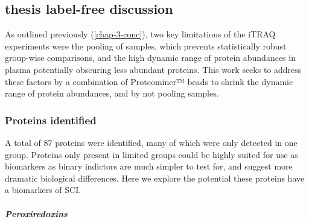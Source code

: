 \documentclass[9pt,lineno]{elife}
\begin{document}
\begin{landscape}
\begin{landscape}
\hypertarget{thesis-label-free-discussion}{%
\subsection{thesis label-free discussion}\label{thesis-label-free-discussion}}

As outlined previously (\ref{chap-3-conc}), two key limitations of the iTRAQ experiments were the pooling of samples, which prevents statistically robust group-wise comparisons, and the high dynamic range of protein abundances in plasma potentially obscuring less abundant proteins.
This work seeks to address these factors by a combination of Proteominer™ beads to shrink the dynamic range of protein abundances, and by not pooling samples.

\hypertarget{proteins-identified-1}{%
\subsubsection{Proteins identified}\label{proteins-identified-1}}

A total of 87 proteins were identified, many of which were only detected in one group.
Proteins only present in limited groups could be highly suited for use as biomarkers as binary indictors are much simpler to test for, and suggest more dramatic biological differences.
Here we explore the potential these proteins have a biomarkers of SCI.

\hypertarget{peroxiredoxins}{%
\subparagraph{Peroxiredoxins}\label{peroxiredoxins}}


\end{landscape}
\end{landscape}
\end{document}
